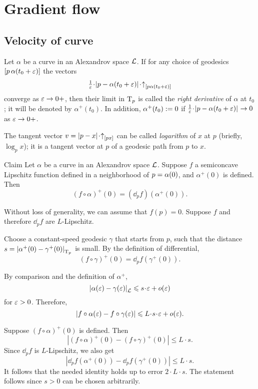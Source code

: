 \chapter{Gradient flow}\label{chap:GF}

\section{Velocity of curve}

Let $\alpha$ be a curve in an Alexandrov space $\mathcal{L}$.
If for any choice of 
geodesics $[p\,\alpha(t_0+\varepsilon)]$ the vectors 
\[\tfrac{1}{\eps}\cdot\dist{p}{\alpha(t_0+\eps)}{}\cdot\dir p{\alpha(t_0+\eps)}\]
converge as $\varepsilon\to 0+$, then their limit in $\mathrm{T}_p$ is called the \emph{right derivative} of $\alpha$ at $t_0$; it will be denoted by $\alpha^+(t_0)$.
In addition, $\alpha^+(t_0)\mathrel{:=}0$
if $\tfrac{1}{\eps}\cdot\dist{p}{\alpha(t_0+\eps)}{}\to 0$ as $\varepsilon\to 0+$.

The tangent vector $v=\dist px{}\cdot\dir px$ can be called \emph{logarithm} of $x$ at $p$ (briefly, $\log_p x$);
it is a tangent vector at $p$ of a geodesic path from $p$ to $x$.\label{page:log}


\begin{thm}{Claim}\label{clm:fa'=dfa'}
Let $\alpha$ be a curve in an Alexandrov space $\mathcal{L}$.
Suppose $f$ a semiconcave Lipschitz function
defined in a neighborhood of $p\z=\alpha(0)$,
and $\alpha^+(0)$ is defined.
Then 
\[(f\circ\alpha)^+(0)
=
(\dd_pf)(\alpha^+(0)).\]
\end{thm}

Without loss of generality, we can assume that $f(p)=0$.
Suppose $f$ and therefore $\dd_pf$ are $L$-Lipschitz.

Choose a constant-speed geodesic $\gamma$ that starts from $p$,
such that the distance
$s=\dist{\alpha^+(0)}{\gamma^+(0)}{\T_p}$
is small.
By the definition of differential,
\[(f\circ\gamma)^+(0)=\dd_pf(\gamma^+(0)).\]

By comparison and the definition of $\alpha^+$,
\[\dist{\alpha(\eps)}{\gamma(\eps)}{\spc{L}}\le s\cdot\eps+o(\eps)\]
for $\varepsilon>0$.
Therefore,
\[|f\circ\alpha(\eps)-f\circ\gamma(\eps)|\le L\cdot s\cdot\eps+o(\eps).\]

Suppose $(f\circ\alpha)^+(0)$ is defined.
Then
\[|(f\circ\alpha)^+(0)-(f\circ\gamma)^+(0)|\le L\cdot s.\]
Since $\dd_pf$ is $L$-Lipschitz, we also get 
\[|\dd_pf(\alpha^+(0))-\dd_pf(\gamma^+(0))|\le L\cdot s.\]
It follows that the needed identity holds up to error $2\cdot L\cdot s$.
The statement follows since $s>0$ can be chosen arbitrarily.

